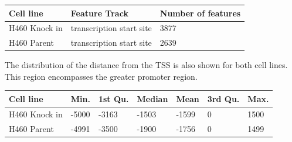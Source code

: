 \documentclass[11pt]{article}
\begin{document}
\newpage

\begin{table}[H]
\centering
	\begin{tabular}{|l|l|l|}
	\hline
		Cell line & Feature Track & Number of features \\ \hline
		H460 Knock in & transcription start site & 3877 \\ \hline
		H460 Parent & transcription start site & 2639 \\ \hline
	\end{tabular}
\end{table}


The distribution of the distance from the TSS is also shown for both cell lines. This region encompasses the greater promoter region.

\begin{table}[H]
\centering
    \begin{tabular}{|l|l|l|l|l|l|l|}
    \hline
     Cell line & Min. & 1st Qu. & Median & Mean & 3rd Qu. &   Max.  \\ \hline
   H460 Knock in  &  -5000  & -3163  & -1503 &  -1599  & 0  &  1500   \\ \hline
   H460 Parent & -4991  & -3500 &  -1900 &  -1756   &    0  &  1499   \\ \hline
    \end{tabular}
\end{table}
\end{document}

